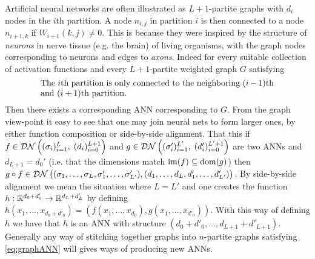\begin{rem}
  Artificial neural networks are often illustrated as
  $L + 1$-partite graphs with $d_i$ nodes in the $i$th partition.
  A node $n_{i,j}$ in partition $i$ is then connected to a node
  $n_{i+1,k}$ if $W_{i+1}(k, j) \neq 0$.
  This is because they were
  inspired by the structure of \emph{neurons}
  in nerve tissue (e.g. the brain) of living organisms,
  with the graph nodes corresponding to neurons and edges to \emph{axons}.
  Indeed for every suitable collection of activation functions
  and every $L+1$-partite weighted graph $G$ satisfying
  \begin{equation}
    \text{\parbox{0.8\textwidth}{The $i$th partition is only
	connected to the neighboring $(i-1)$th and $(i+1)$th partition.
    }}
    \label{eq:graphANN}
  \end{equation}
  Then there exists a corresponding ANN corresponding to $G$.
  From the graph view-point it easy to see that one may join neural nets
  to form larger ones, by either function composition or side-by-side
  alignment.
  That this if
  $f \in \mathcal{DN}\left( (\sigma_i)_{i=1}^{L},\; (d_i)_{i=0}^{L + 1} \right)$
  and
  $g \in \mathcal{DN}\left( (\sigma'_i)_{i=1}^{L'},\; (d'_i)_{i=0}^{L' + 1} \right)$
  are two ANNs and $d_{L+1} = d_0'$ (i.e. that
  the dimensions match $\mathrm{im}(f) \subseteq \mathrm{dom}(g)$)
  then
  $g \circ f \in \mathcal{DN}
  \left( (\sigma_1, \dots, \sigma_L, \sigma'_1, \dots,
  \sigma'_{L'}), (d_1, \dots, d_L, d'_1, \dots, d'_{L'}) \right)$.
  By side-by-side alignment we mean the situation where $L = L'$
  and one creates the function
  $h : \mathbb{R}^{d_0 + d'_0} \to \mathbb{R}^{d_L + d'_L}$
  by defining $h(x_1, \dots, x_{d_0 + d'_0})
  = (f(x_1, \dots, x_{d_0}), g(x_1, \dots, x_{d'_0}))$.
  With this way of defining $h$ we have that
  $h$ is an ANN with structure $(d_0 + d'_0, \dots, d_{L+1} + d'_{L+1})$.
  Generally any way of stitching together graphs into $n$-partite graphs
  satisfying \cref{eq:graphANN}
  will gives ways of producing new ANNs. 
  \label{rem:annGraph}
\end{rem}

